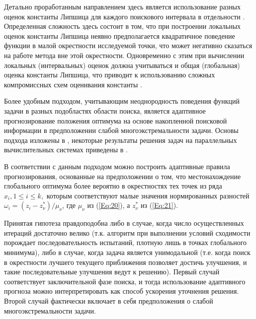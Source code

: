 \documentclass[
11pt,%
tightenlines,%
twoside,%
onecolumn,%
nofloats,%
nobibnotes,%
nofootinbib,%
superscriptaddress,%
noshowpacs,%
centertags]%
{revtex4}
\begin{document}
Детально проработанным направлением здесь является использование разных оценок константы Липшица для каждого поискового интервала в отдельности \cite{Sergeyev2003,Sergeyev2007}. Определенная сложность здесь состоит в том, что при построении локальных оценок константы Липшица неявно предполагается квадратичное поведение функции в малой окрестности исследуемой точки, что может негативно сказаться на работе метода вне этой окрестности. 
Одновременно с этим при вычислении локальных (интервальных) оценок должна учитываться и общая (глобальная) оценка константы Липшица, что приводит к использованию сложных компромиссных схем оценивания константы \cite{Sergeyev2020}.




Более удобным подходом, учитывающим неоднородность поведения функций задачи в разных подобластях области поиска,  является адаптивное прогнозирование положения оптимума на основе накопленной поисковой информации в предположении слабой многоэкстремальности задачи. Основы подхода изложены в \cite{Strongin2000}, некоторые результаты решения задач на параллельных вычислительных системах приведены в \cite{Barkalov2010}.

В соответствии с данным подходом можно построить адаптивные правила прогнозирования, основанные на предположении о том, что местонахождение глобального оптимума более вероятно в окрестностях тех точек из ряда $x_i, 1 \leq i \leq k,$ которым соответствуют малые значения нормированных разностей $\omega_i=(z_i-z_\nu^*)/\mu_\nu$, где $\mu_\nu$ из (\ref{Eq:20}), а $z_\nu^*$ из (\ref{Eq:21}).


Принятая гипотеза правдоподобна либо в случае, когда число осуществленных итераций достаточно велико (т.к. алгоритм при выполнении условий сходимости порождает последовательность испытаний, плотную лишь в точках глобального минимума), либо в случае, когда задача является унимодальной (т.е. когда поиск в окрестности лучшего текущего приближения позволяет достичь улучшения, и такие последовательные улучшения ведут к решению). Первый случай соответствует заключительной фазе поиска, и тогда использование адаптивного прогноза можно интерпретировать как способ ускорения уточнения решения. Второй случай фактически включает в себя предположения о слабой многоэкстремальности задачи.
\end{document}
